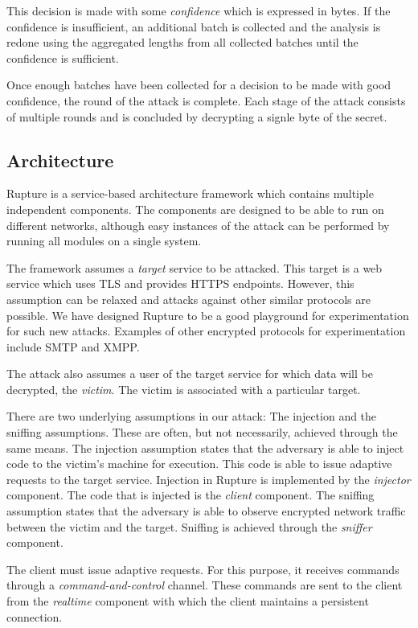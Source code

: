This decision is made with some \textit{confidence} which is expressed in bytes.
If the confidence is insufficient, an additional batch is collected and the
analysis is redone using the aggregated lengths from all collected batches until
the confidence is sufficient.

Once enough batches have been collected for a decision to be made with good
confidence, the round of the attack is complete.  Each stage of the attack
consists of multiple rounds and is concluded by decrypting a signle byte of the
secret.

\subsection{Architecture}\label{app:rupture}
Rupture is a service-based architecture framework which contains multiple
independent components. The components are designed to be able to run
on different networks, although easy instances
of the attack can be performed by running all modules on a single system.

The framework assumes a \textit{target} service to be attacked. This target is a
web service which uses TLS and provides HTTPS endpoints. However, this
assumption can be relaxed and attacks against other similar protocols are
possible.  We have designed Rupture to be a good playground for experimentation
for such new attacks. Examples of other encrypted protocols for experimentation
include SMTP and XMPP.

The attack also assumes a user of the target service for which data will be
decrypted, the \textit{victim}. The victim is associated with a particular
target.

There are two underlying assumptions in our attack: The injection and the
sniffing assumptions. These are often, but not necessarily, achieved through the
same means. The injection assumption states that the adversary is able to
inject code to the victim's machine for execution. This code is able to issue
adaptive requests to the target service. Injection in Rupture is implemented by
the \textit{injector} component. The code that is injected is the
\textit{client} component.  The sniffing assumption states that the adversary is
able to observe encrypted network traffic between the victim and the target.
Sniffing is achieved through the \textit{sniffer} component.

The client must issue adaptive requests. For this purpose, it receives commands
through a \textit{command-and-control} channel. These commands are sent to the
client from the \textit{realtime} component with which the client maintains a
persistent connection.

